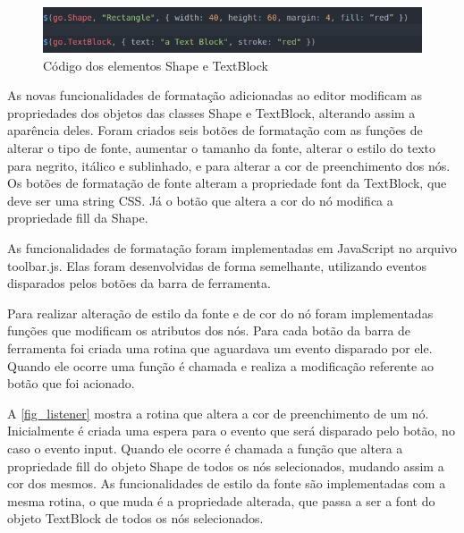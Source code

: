 \documentclass[
	12pt,				%
	openright,			%
	oneside,			%
	a4paper,			%
	english,			%
	french,				%
	spanish,			%
	brazil				%
	]{abntex2}
\begin{document}
\begin{figure}[htb]
	\caption{\label{fig_gojselements} Código dos elementos Shape e TextBlock}
	\begin{center}
		\includegraphics[scale=0.6]{gojselements.png}
	\end{center}
\end{figure}

As novas funcionalidades de formatação adicionadas ao editor modificam as propriedades dos objetos das classes Shape e TextBlock, alterando assim a aparência deles. Foram criados seis botões de formatação com as funções de alterar o tipo de fonte, aumentar o tamanho da fonte, alterar o estilo do texto para negrito, itálico e sublinhado, e para alterar a cor de preenchimento dos nós. Os botões de formatação de fonte alteram a propriedade font da TextBlock, que deve ser uma string  CSS. Já o botão que altera a cor do nó modifica a propriedade fill da Shape.

As funcionalidades de formatação foram implementadas em JavaScript no arquivo toolbar.js. Elas foram desenvolvidas de forma semelhante, utilizando eventos disparados pelos botões da barra de ferramenta.

Para realizar alteração de estilo da fonte e de cor do nó foram implementadas funções que modificam os atributos dos nós. Para cada botão da barra de ferramenta foi criada uma rotina que aguardava um evento disparado por ele. Quando ele ocorre uma função é chamada e realiza a modificação referente ao botão que foi acionado. 

A \autoref{fig_listener} mostra a rotina que altera a cor de preenchimento de um nó. Inicialmente é criada uma espera para o evento que será disparado pelo botão, no caso o evento input. Quando ele ocorre é chamada a função que altera a propriedade fill do objeto Shape de todos os nós selecionados, mudando assim a cor dos mesmos. As funcionalidades de estilo da fonte são implementadas com a mesma rotina, o que muda é a propriedade alterada, que passa a ser a font do objeto TextBlock de todos os nós selecionados.    
\end{document}
